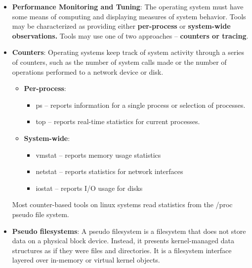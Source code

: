 \documentclass{report}
\begin{document}
\begin{itemize}
            \bigbreak \noindent 
            Once the kernel has started and the necessary drivers are installed, the kernel switches the root file system from the temporary RAM location to the appropriate root file system. Finally linux creates the systemd process, the initial process of the system, and then starts other services.
        \item \textbf{Performance Monitoring and Tuning}:  The operating system must have some means of computing and displaying measures of system behavior.
            \bigbreak \noindent 
            Tools may be characterized as providing either \textbf{per-process} or \textbf{system-wide observations.}
            \bigbreak \noindent 
            Tools may use one of two approaches – \textbf{counters or tracing}.
        \item \textbf{Counters}: Operating systems keep track of system activity through a series of counters, such as the number of system calls made or the number of operations performed to a network device or disk.
            \begin{itemize}
                \item \textbf{Per-process}: 
                    \begin{itemize}
                        \item ps – reports information for a single process or selection of processes.
                        \item top – reports real-time statistics for current processes.
                    \end{itemize}
                \item \textbf{System-wide}: 
                    \begin{itemize}
                        \item vmstat – reports memory usage statistics
                        \item netstat – reports statistics for network interfaces
                        \item iostat – reports I/O usage for disks
                    \end{itemize}
            \end{itemize}
            Most counter-based tools on linux systems read statistics from the /proc pseudo file system.
        \item \textbf{Pseudo filesystems}: A pseudo filesystem is a filesystem that does not store data on a physical block device. Instead, it presents kernel-managed data structures as if they were files and directories. It is a filesystem interface layered over in-memory or virtual kernel objects.

\end{itemize}
\end{document}
